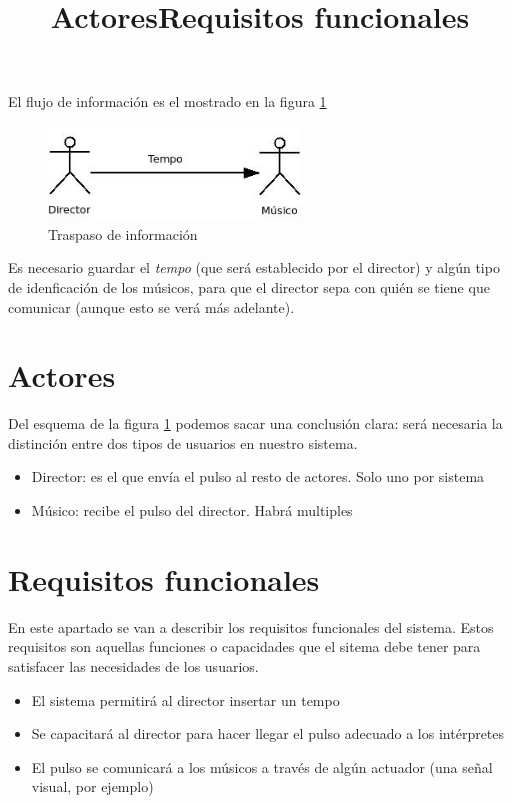 El flujo de información es el mostrado en la figura \ref{fig:mensajesconceptual}
  \begin{figure}[htb]
  \centering
  \includegraphics[width=0.6\textwidth]{./imagenes/mensajesconceptual}
  \caption{Traspaso de información} \label{fig:mensajesconceptual}
  \end{figure}


Es necesario guardar el \textit{tempo} (que será establecido por el director) y algún tipo
de idenficación de los músicos, para que el director sepa con quién se tiene que
comunicar (aunque esto se verá más adelante).\\


\title{Actores}
\section{Actores}
\label{sec:actoresRequisitos}

Del esquema de la figura \ref{fig:mensajesconceptual} podemos sacar una conclusión clara:
será necesaria la distinción entre dos tipos de usuarios en nuestro sistema.
  \begin{itemize}
    \item Director: es el que envía el pulso al resto de actores. Solo uno por sistema
    \item Músico: recibe el pulso del director. Habrá multiples
  \end{itemize}


\title{Requisitos funcionales}
\section{Requisitos funcionales}

En este apartado se van a describir los requisitos funcionales del sistema.
Estos requisitos son aquellas funciones o capacidades que el sitema debe
tener para satisfacer las necesidades de los usuarios.\\

\begin{itemize}
    \item[\textbf{RF.1}] El sistema permitirá al director insertar un tempo
    \item[\textbf{RF.2}] Se capacitará al director para hacer llegar el pulso adecuado a los intérpretes
    \item[\textbf{RF.3}] El pulso se comunicará a los músicos a través de algún actuador (una señal visual, por ejemplo)
\end{itemize}


